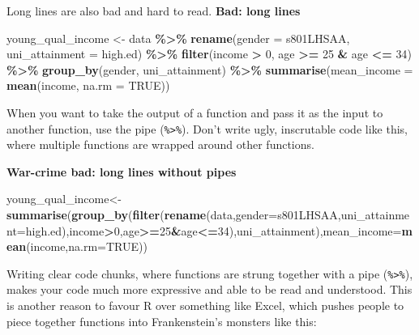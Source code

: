 \documentclass[
]{book}
\newenvironment{Shaded}{\begin{snugshade}}{\end{snugshade}}
\newcommand{\DataTypeTok}[1]{\textcolor[rgb]{0.13,0.29,0.53}{#1}}
\newcommand{\DecValTok}[1]{\textcolor[rgb]{0.00,0.00,0.81}{#1}}
\newcommand{\KeywordTok}[1]{\textcolor[rgb]{0.13,0.29,0.53}{\textbf{#1}}}
\newcommand{\NormalTok}[1]{#1}
\newcommand{\OperatorTok}[1]{\textcolor[rgb]{0.81,0.36,0.00}{\textbf{#1}}}
\newcommand{\OtherTok}[1]{\textcolor[rgb]{0.56,0.35,0.01}{#1}}
\newcommand{\StringTok}[1]{\textcolor[rgb]{0.31,0.60,0.02}{#1}}
\begin{document}
Long lines are also bad and hard to read.
\textbf{Bad: long lines}

\begin{Shaded}
\begin{Highlighting}[]
\NormalTok{young\_qual\_income \textless{}{-}}\StringTok{ }\NormalTok{data }\OperatorTok{\%\textgreater{}\%}\StringTok{ }\KeywordTok{rename}\NormalTok{(}\DataTypeTok{gender =}\NormalTok{ s801LHSAA, }\DataTypeTok{uni\_attainment =}\NormalTok{ high.ed) }\OperatorTok{\%\textgreater{}\%}\StringTok{ }\KeywordTok{filter}\NormalTok{(income }\OperatorTok{\textgreater{}}\StringTok{ }\DecValTok{0}\NormalTok{, age }\OperatorTok{\textgreater{}=}\StringTok{ }\DecValTok{25} \OperatorTok{\&}\StringTok{ }\NormalTok{age }\OperatorTok{\textless{}=}\StringTok{ }\DecValTok{34}\NormalTok{) }\OperatorTok{\%\textgreater{}\%}\StringTok{ }\KeywordTok{group\_by}\NormalTok{(gender, uni\_attainment) }\OperatorTok{\%\textgreater{}\%}\StringTok{ }\KeywordTok{summarise}\NormalTok{(}\DataTypeTok{mean\_income =} \KeywordTok{mean}\NormalTok{(income, }\DataTypeTok{na.rm =} \OtherTok{TRUE}\NormalTok{))}
\end{Highlighting}
\end{Shaded}

When you want to take the output of a function and pass it as the input to another function, use the pipe (\texttt{\%\textgreater{}\%}). Don't write ugly, inscrutable code like this, where multiple functions are wrapped around other functions.

\textbf{War-crime bad: long lines without pipes}

\begin{Shaded}
\begin{Highlighting}[]
\NormalTok{young\_qual\_income\textless{}{-}}\KeywordTok{summarise}\NormalTok{(}\KeywordTok{group\_by}\NormalTok{(}\KeywordTok{filter}\NormalTok{(}\KeywordTok{rename}\NormalTok{(data,}\DataTypeTok{gender=}\NormalTok{s801LHSAA,}\DataTypeTok{uni\_attainment=}\NormalTok{high.ed),income}\OperatorTok{\textgreater{}}\DecValTok{0}\NormalTok{,age}\OperatorTok{\textgreater{}=}\DecValTok{25}\OperatorTok{\&}\NormalTok{age}\OperatorTok{\textless{}=}\DecValTok{34}\NormalTok{),uni\_attainment),}\DataTypeTok{mean\_income=}\KeywordTok{mean}\NormalTok{(income,}\DataTypeTok{na.rm=}\OtherTok{TRUE}\NormalTok{))}
\end{Highlighting}
\end{Shaded}

Writing clear code chunks, where functions are strung together with a pipe (\texttt{\%\textgreater{}\%}), makes your code much more expressive and able to be read and understood. This is another reason to favour R over something like Excel, which pushes people to piece together functions into Frankenstein's monsters like this:
\end{document}
